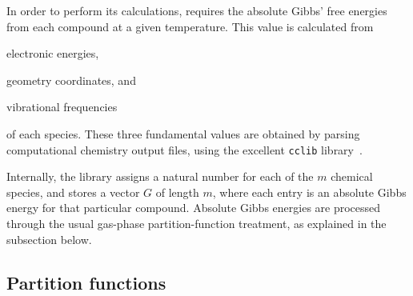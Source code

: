 In order to perform its calculations,
\overreact{} requires the absolute Gibbs' free energies from each compound at a given temperature.
This value is calculated from
\begin{enumerate*}
	\item electronic energies,
	\item geometry coordinates,
	      and
	\item vibrational frequencies
\end{enumerate*}
of each species.
These three fundamental values are obtained
by parsing computational chemistry output files,
using the excellent \texttt{cclib} library~\cite{O_boyle_2008}.

Internally,
the library assigns a natural number for each of the $m$ chemical species,
and stores a vector $G$ of length $m$,
where each entry is an absolute Gibbs energy for that particular compound.
Absolute Gibbs energies are processed through the usual gas-phase partition-function treatment,
as explained in the subsection below.

\subsection{Partition functions}


